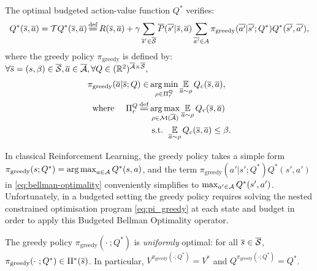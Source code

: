 \documentclass{article}
\begin{document}
\begin{theorem}
\label{thm:bellman-optimality}
The optimal budgeted action-value function $Q^*$ verifies:
\begin{equation}
\label{eq:bellman-optimality}
    Q^{*}(\os, \oa) = \cT Q^{*}(\os, \oa) \eqdef R(\os, \oa) + \gamma \sum_{\os'\in\ocS} \ov{P}(\ov{s'} | \os, \oa)\sum_{\ov{a'}\in A} \pi_\text{greedy}(\ov{a'}|\ov{s'}; Q^*) Q^{*}(\ov{s'}, \ov{a'}),
\end{equation}
where the greedy policy $\pi_\text{greedy}$ is defined by: $\forall \overline{s}=(s,\beta)\in \overline{\mathcal{S}}, \overline{a}\in 
\overline{\mathcal{A}}, \forall Q\in(\mathbb{R}^2)^{\overline{\mathcal{A}}\times\overline{\mathcal{S}}},$
\begin{subequations}
\label{eq:pi_greedy}
\begin{align}
    \pi_\text{greedy}(\oa|\os; Q) \in &\argmin_{\rho\in\Pi_r^Q} \expectedvalueover{\oa\sim\rho}Q_c(\os, \oa), \label{eq:pi_greedy_cost}\\
    \text{where }\quad\Pi_r^Q \eqdef &\argmax_{\rho\in\cM(\ocA)} \expectedvalueover{\oa\sim\rho} Q_r(\os, \oa) \label{eq:pi_greedy_reward}\\
    & \text{ s.t. }  \expectedvalueover{\oa\sim\rho} Q_c(\os, \oa) \leq \beta. \label{eq:pi_greedy_constraint}
\end{align}
\end{subequations}
\end{theorem}

\begin{remark}
In classical Reinforcement Learning, the greedy policy takes a simple form $\pi_\text{greedy}(s; Q^*) = \operatorname*{arg\,max}_{a\in\mathcal{A}} Q^*(s, a)$, and the term $\pi_\text{greedy}(a'|s';Q^*) Q^{*}(s', a')$ in \eqref{eq:bellman-optimality} conveniently simplifies to $\max_{a'\in \mathcal{A}} Q^*(s', a')$. Unfortunately, in a budgeted setting the greedy policy requires solving the nested constrained optimisation program \eqref{eq:pi_greedy} at each state and budget in order to apply this Budgeted Bellman Optimality operator.
\end{remark}

\begin{proposition}
\label{prop:greedy_optimal}
The greedy policy $\pi_\text{greedy}(\cdot~; Q^*)$ is \emph{uniformly} optimal: for all $\overline{s}\in\overline{\mathcal{S}}$, $\pi_\text{greedy}(\cdot~; Q^*)\in\Pi^*(\overline{s})$. In particular, $V^{\pi_\text{greedy}(\cdot; Q^*)} = V^*$ and $Q^{\pi_\text{greedy}(\cdot; Q^*)}= Q^*$.
\end{proposition}
\end{document}
